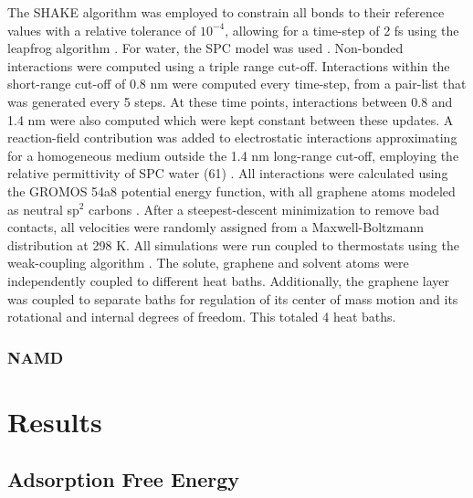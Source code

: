 \documentclass[twoside,twocolumn,9pt]{article}
\begin{document}
The SHAKE algorithm \cite{Ryckaert_1977} was employed to constrain all
bonds to their reference values with a relative tolerance of
$10^{-4}$, allowing for a time-step of 2 fs using the leapfrog
algorithm \cite{Hockney_1977}.  For water, the SPC model was used
\cite{Berendsen_1981}.  Non-bonded interactions were computed using a
triple range cut-off. Interactions within the short-range cut-off of
0.8 nm were computed every time-step, from a pair-list that was
generated every 5 steps.  At these time points, interactions between
0.8 and 1.4 nm were also computed which were kept constant between
these updates.  A reaction-field contribution was added to
electrostatic interactions approximating for a homogeneous medium
outside the 1.4 nm long-range cut-off, employing the relative
permittivity of SPC water (61) \cite{Tironi_1995}. All interactions
were calculated using the GROMOS 54a8 potential energy function, with
all graphene atoms modeled as neutral sp$^2$ carbons \cite{Reif_2012}.
After a steepest-descent minimization to remove bad contacts, all
velocities were randomly assigned from a Maxwell-Boltzmann
distribution at 298 K.  All simulations were run coupled to
thermostats using the weak-coupling algorithm
\cite{Berendsen_1984}. The solute, graphene and solvent atoms were
independently coupled to different heat baths. Additionally, the
graphene layer was coupled to separate baths for regulation of its
center of mass motion and its rotational and internal degrees of
freedom. This totaled 4 heat baths.

\subsubsection{NAMD}






\section{Results}

\subsection{Adsorption Free Energy}
\end{document}
